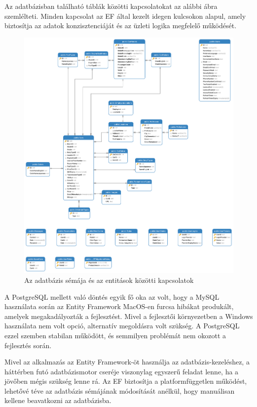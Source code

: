 \documentclass{report}[11pt]
\begin{document}
Az adatbázisban található táblák közötti kapcsolatokat az alábbi ábra szemlélteti. Minden kapcsolat az EF által kezelt idegen kulcsokon alapul, amely biztosítja az adatok konzisztenciáját és az üzleti logika megfelelő működését.  

\begin{figure}[H]
    \centering
    \includegraphics[width=1.0\textwidth]{figures/db_diagram.png} 
    \caption{Az adatbázis sémája és az entitások közötti kapcsolatok}
    \label{fig:db_schema}
\end{figure}

A PostgreSQL mellett való döntés egyik fő oka az volt, hogy a MySQL használata során az Entity Framework MacOS-en furcsa hibákat produkált, amelyek megakadályozták a fejlesztést. Mivel a fejlesztői környezetben a Windows használata nem volt opció, alternatív megoldásra volt szükség. A PostgreSQL ezzel szemben stabilan működött, és semmilyen problémát nem okozott a fejlesztés során.  

Mivel az alkalmazás az Entity Framework-öt használja az adatbázis-kezeléshez, a háttérben futó adatbázismotor cseréje viszonylag egyszerű feladat lenne, ha a jövőben mégis szükség lenne rá. Az EF biztosítja a platformfüggetlen működést, lehetővé téve az adatbázis sémájának módosítását anélkül, hogy manuálisan kellene beavatkozni az adatbázisba.  
\end{document}
